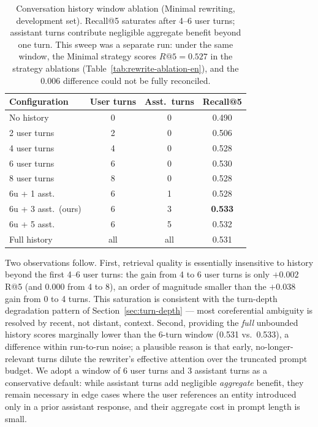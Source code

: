 \begin{table}[h]
\centering
\begin{tabular}{lccc}
\toprule
\textbf{Configuration} & \textbf{User turns} & \textbf{Asst.\ turns} & \textbf{Recall@5} \\
\midrule
No history        & 0    & 0    & 0.490 \\
2 user turns       & 2    & 0    & 0.506 \\
4 user turns       & 4    & 0    & 0.528 \\
6 user turns       & 6    & 0    & 0.530 \\
8 user turns       & 8    & 0    & 0.528 \\
6u + 1 asst.\      & 6    & 1    & 0.528 \\
6u + 3 asst.\ (ours) & 6  & 3    & \textbf{0.533} \\
6u + 5 asst.\      & 6    & 5    & 0.532 \\
Full history       & all  & all  & 0.531 \\
\bottomrule
\end{tabular}
\caption{Conversation history window ablation (Minimal rewriting, development set). Recall@5
saturates after 4--6 user turns; assistant turns contribute negligible aggregate benefit beyond
one turn. This sweep was a separate run: under the same window, the Minimal strategy scores
$R@5{=}0.527$ in the strategy ablations (Table~\ref{tab:rewrite-ablation-en}), and the $0.006$ difference
could not be fully reconciled.}
\label{tab:history-ablation}
\end{table}

Two observations follow. First, retrieval quality is essentially insensitive to history beyond the
first 4--6 user turns: the gain from 4 to 6 user turns is only $+0.002$ R@5 (and $0.000$ from 4 to 8), an order of magnitude
smaller than the $+0.038$ gain from 0 to 4 turns. This saturation is consistent with the turn-depth
degradation pattern of Section~\ref{sec:turn-depth} — most coreferential ambiguity is resolved by
recent, not distant, context. Second, providing the \emph{full} unbounded history scores marginally
lower than the 6-turn window (0.531 vs.\ 0.533), a difference within run-to-run noise; a plausible reason is that early, no-longer-relevant
turns dilute the rewriter's effective attention over the truncated prompt budget. We adopt a window
of 6 user turns and 3 assistant turns as a conservative default: while assistant turns add negligible
\emph{aggregate} benefit, they remain necessary in edge cases where the user references an entity
introduced only in a prior assistant response, and their aggregate cost in prompt length is small.
